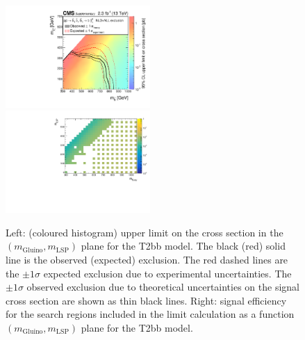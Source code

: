 \begin{figure}[t]
  \begin{center}
    \includegraphics[width=0.49\textwidth]{supplementary/figures/RA1T2bbXSEC} \, 
    \includegraphics[width=0.49\textwidth]{supplementary/figures/T2bb_merging_4_cats} \,     
  \end{center}
  \caption{Left: (coloured histogram) upper limit on the cross section in the $(m_{\mathrm{Gluino}},m_{\mathrm{LSP}})$ plane for the T2bb model. 
  The black (red) solid line is the observed (expected) exclusion. The red dashed lines are the $\pm1\sigma$ expected exclusion due to experimental uncertainties. 
  The $\pm1\sigma$ observed exclusion due to theoretical uncertainties on the signal cross section are shown as thin black lines. 
  Right: signal efficiency for the search regions included in the limit calculation as a function $(m_{\mathrm{Gluino}},m_{\mathrm{LSP}})$ plane for the T2bb model. 
  \label{fig:T2bb_excl}}
\end{figure}



